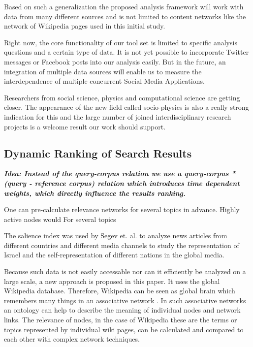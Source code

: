\documentclass[a4paper,10pt]{scrbook}
\begin{document}
Based on such a generalization the proposed analysis framework will work with
data from many different sources and is not limited to content networks like
the network of Wikipedia pages used in this initial study.

Right now, the core functionality of our tool set is limited to specific
analysis questions and a certain type of data. It is not yet
possible to incorporate Twitter messages or Facebook posts into our analysis
easily. But in the future, an integration of multiple data sources will enable
us to measure the interdependence of multiple concurrent Social Media
Applications.

Researchers from social science, physics and computational science are getting
closer. The appearance of the new field called socio-physics is also a really
strong indication for this and the large number of joined interdisciplinary
research projects is a welcome result our work should support.

\subsection{Dynamic Ranking of Search Results}

\textit{\textbf{Idea: Instead of the query-corpus relation we use a query-corpus * (query - reference corpus) relation which introduces time dependent weights, which directly influence the results ranking.}}

One can pre-calculate relevance networks for several topics in advance. Highly active nodes would For several topics

The salience index was used by Segev et. al. \cite{Segev2010} to analyze news
articles from different countries and different media channels to study the
representation of Israel and the self-representation of different nations in the
global media.

Because such data is not easily accessable nor can it efficiently be analyzed on
a large scale, a new approach is proposed in this paper. It  uses the global
Wikipedia database. Therefore, Wikipedia can be seen as global brain which
remembers many things in an associative network
\cite{Schnabl.1972,Russell.1983}. In such associative networks an ontology can help to describe the meaning of individual nodes and
network links. The relevance of nodes, in the case of
Wikipedia these are the terms or topics represented by individual wiki pages,
can be calculated and compared to each other with complex network techniques. 
 
\end{document}
